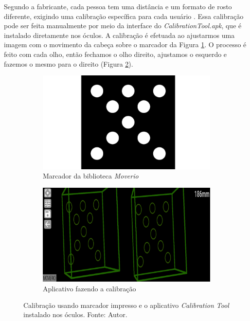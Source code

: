 Segundo a fabricante, cada pessoa tem uma distância e um formato de rosto diferente, exigindo uma calibração específica para cada usuário \cite{Maruyama2018}. Essa calibração pode ser feita manualmente por meio da interface do \textit{CalibrationTool.apk}, que é instalado diretamente nos óculos. A calibração é efetuada ao ajustarmos uma imagem com o movimento da cabeça sobre o marcador da Figura \ref{fig:marker}. O processo é feito com cada olho, então fechamos o olho direito, ajustamos o esquerdo e fazemos o mesmo para o direito (Figura \ref{fig:calib}).

\begin{figure}[ht]
\centering
    \begin{subfigure}{0.45\textwidth}
        \centering
        \includegraphics[width=.95\textwidth]{figuras/Marcador.png}
        \caption{Marcador da biblioteca \textit{Moverio}}
        \label{fig:marker}
    \end{subfigure}
    \begin{subfigure}{0.45\textwidth}
        \includegraphics[width=.95\textwidth]{figuras/Calibration.png}
        \caption{Aplicativo fazendo a calibração}
        \label{fig:calib}
    \end{subfigure}
    \caption{Calibração usando marcador impresso e o aplicativo \textit{Calibration Tool} instalado nos óculos. Fonte: Autor.}      
    \label{fig:calibration}
\end{figure}


